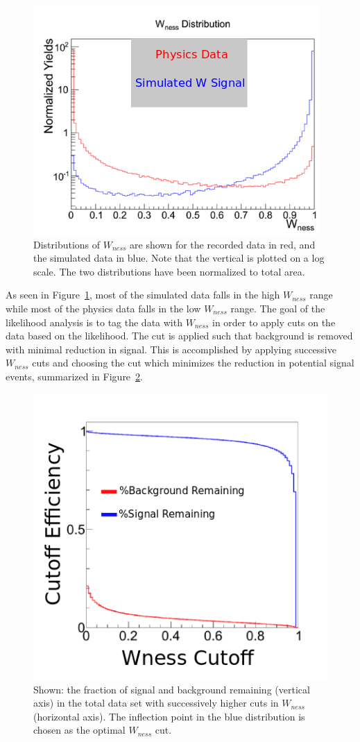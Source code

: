 \begin{figure}[ht]
  \centering
  \includegraphics[width=0.7\linewidth]{./figures/wness_sig_bak.png}
  \caption{
		Distributions of $W_{ness}$ are shown for the recorded data in red, and the
		simulated data in blue. Note that the vertical is plotted on a log scale.
		The two distributions have been normalized to total area. 
  }
  \label{fig:wness_distribution}
\end{figure}

As seen in Figure~\ref{fig:wness_distribution}, most of the simulated data falls
in the high $W_{ness}$ range while most of the physics data falls in the low
$W_{ness}$ range. The goal of the likelihood analysis is to tag the data with
$W_{ness}$ in order to apply cuts on the data based on the likelihood. The cut
is applied such that background is removed with minimal reduction in signal.
This is accomplished by applying successive $W_{ness}$ cuts and choosing the cut
which minimizes the reduction in potential signal events, summarized in
Figure~\ref{fig:wness_cut_efficiency}.

\begin{figure}[ht]
  \centering
  \includegraphics[width=0.7\linewidth]{./figures/wness_cut_efficiency.png}
  \caption{
		Shown: the fraction of signal and background remaining (vertical axis) in
		the total data set with successively higher cuts in $W_{ness}$ (horizontal
		axis). The inflection point in the blue distribution is chosen as the
		optimal $W_{ness}$ cut.
  }
  \label{fig:wness_cut_efficiency}
\end{figure}


